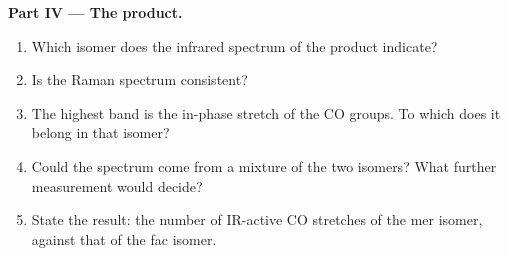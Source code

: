 \begin{problem}
\medskip\noindent\textbf{Part IV --- The product.}
\begin{enumerate}[resume]
  \item Which isomer does the infrared spectrum of the product indicate?
  \item Is the Raman spectrum consistent?
  \item The highest band is the in-phase stretch of the CO groups. To which
         does it belong in that isomer?
  \item Could the spectrum come from a mixture of the two isomers? What
        further measurement would decide?
  \item State the result: the number of IR-active CO stretches of the mer
        isomer, against that of the fac isomer.
\end{enumerate}
\end{problem}
